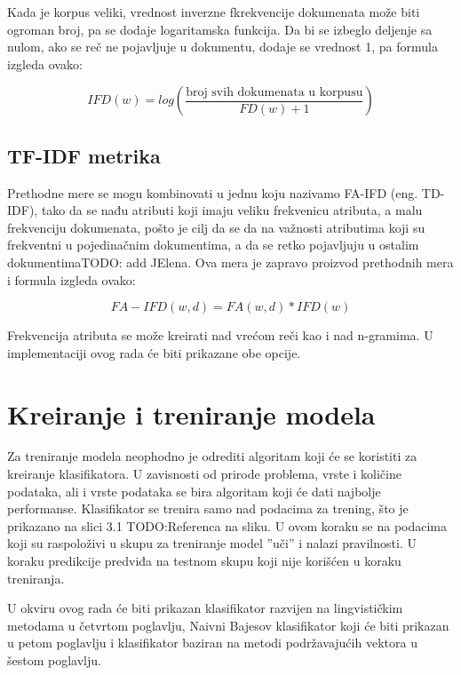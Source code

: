 \documentclass[12pt,oneside]{memoir}
\begin{document}
Kada je korpus veliki,  vrednost inverzne fkrekvencije dokumenata može biti ogroman broj, pa se dodaje logaritamska funkcija.  Da bi se izbeglo deljenje sa nulom, ako se reč ne pojavljuje u dokumentu,  dodaje se vrednost 1, pa formula izgleda ovako:

\begin{equation}
	IFD(w) = log\left(\frac{\text{broj svih dokumenata u korpusu}}{FD(w) + 1}\right)
\end{equation}

\subsection{TF-IDF metrika}

Prethodne mere se mogu kombinovati u jednu koju nazivamo FA-IFD (eng.  TD-IDF), tako da se nađu atributi koji imaju veliku frekvenicu atributa,  a malu frekvenciju dokumenata, pošto je cilj da se da na važnosti atributima koji su frekventni u pojedinačnim dokumentima, a da se retko pojavljuju u ostalim dokumentimaTODO: add JElena.  Ova mera je zapravo proizvod prethodnih mera i formula izgleda ovako:

\begin{equation}
	FA-IFD(w, d) = FA(w,d) * IFD(w)
\end{equation}

Frekvencija atributa se može kreirati nad vrećom reči kao i nad n-gramima.  U implementaciji ovog rada će biti prikazane obe opcije.

\section{Kreiranje i treniranje modela}

Za treniranje modela neophodno je odrediti algoritam koji će se koristiti za kreiranje klasifikatora. U zavisnosti od prirode problema, vrste i količine podataka, ali i vrste podataka se bira algoritam koji će dati najbolje performanse. Klasifikator se trenira samo nad podacima za trening, što je prikazano na slici 3.1 TODO:Referenca na sliku. U ovom koraku se na podacima koji su raspoloživi u skupu za treniranje model ”uči” i nalazi pravilnosti. U koraku predikcije predviđa na testnom skupu koji nije korišćen u koraku treniranja.

U okviru ovog rada će biti prikazan klasifikator razvijen na lingvističkim metodama u četvrtom poglavlju, Naivni Bajesov klasifikator koji će biti prikazan u petom poglavlju i klasifikator baziran na metodi podržavajućih vektora u šestom poglavlju.
\end{document}

